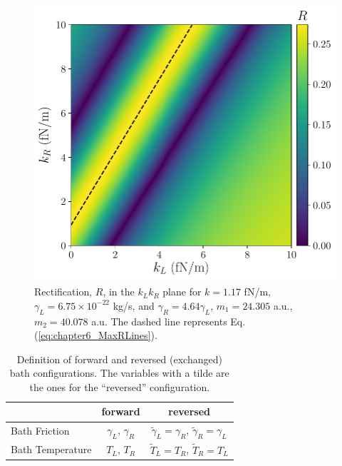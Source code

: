 \begin{figure}
  \center
  \includegraphics[width=0.75\linewidth]{Figures/RwMPlota.pdf}
  \caption{Rectification, $R$, in the $k_L k_R$ plane for $k = 1.17$ fN/m, $\gamma_L = 6.75\times 10^{-22}$ kg/s, and $\gamma_R = 4.64\gamma_L$, $m_1 = 24.305$ a.u., $m_2 = 40.078$ a.u. The dashed  line represents Eq.  (\ref{eq:chapter6_MaxRLines}).}
  \label{fig:Fig_rectification_K_plane}
\end{figure}



\begin{table}[]
\center
\caption{Definition of forward and reversed (exchanged) bath configurations. The variables with a tilde are the ones for the ``reversed'' configuration.}
\begin{tabular}{lcc}
\hline
& forward                & reversed                                                       \\ \hline
Bath Friction    & $\gamma_L$, $\gamma_R$ & $\tilde{\gamma}_L =\gamma_R $,  $\tilde{\gamma}_R =\gamma_L $   \\
Bath Temperature & $T_L$, $T_R$           & $\tilde{T}_L =T_R $,  $\tilde{T}_R =T_L $                     \\
\hline
\end{tabular}
\label{tab:reversed_bath}
\end{table}
%
%
